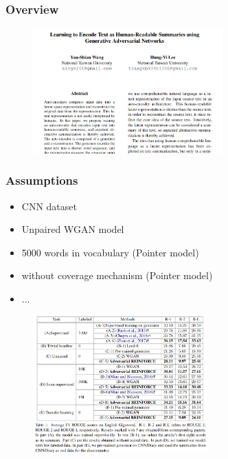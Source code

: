 \documentclass{tum-presentation}
\begin{document}
\begin{frame}
	\frametitle{Overview}
	\begin{figure}
		\centering
		\includegraphics[width=0.65\textwidth,keepaspectratio=true]{tum-resources/images/paper_1.png}
		\label{fig:paper_1}
	\end{figure}
\end{frame}

\begin{frame}
	\frametitle{Assumptions}
	\begin{itemize}
		\item CNN dataset
		\item Unpaired WGAN model
		\item 5000 words in vocabulary (Pointer model)
		\item without coverage mechanism (Pointer model)
		\item ...
	\end{itemize}
\end{frame}

\begin{frame}
	\begin{figure}
		\centering
		\includegraphics[width=0.6\textwidth,keepaspectratio=true]{tum-resources/images/paper_4.png}
		\label{fig:paper_4}
	\end{figure}
\end{frame}
\end{document}
